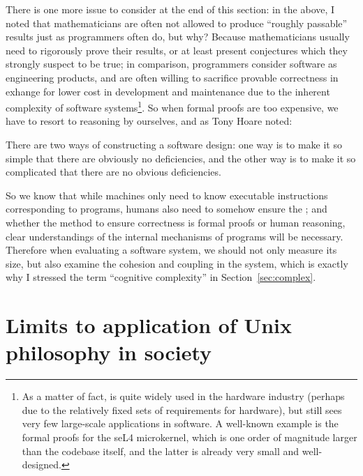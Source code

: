 There is one more issue to consider at the end of this section: in the above, I
noted that mathematicians are often not allowed to produce ``roughly passable''
results just as programmers often do, but why?  Because mathematicians usually
need to rigorously prove their results, or at least present conjectures which
they strongly suspect to be true; in comparison, programmers consider software
as engineering products, and are often willing to sacrifice provable correctness
in exhange for lower cost in development and maintenance due to the inherent
complexity of software systems\footnote{\label{fn:formal}As a matter of fact,
 is quite widely used in the hardware industry
(perhaps due to the relatively fixed sets of requirements for hardware),
but still sees very few large-scale applications in software.  A well-known
example is the formal proofs for the seL4 microkernel,
which is one order of magnitude larger than the codebase itself, and the
latter is already very small and well-designed.}.  So when formal proofs
are too expensive, we have to resort to reasoning by ourselves,
and as Tony Hoare noted:
\begin{quoting}
	There are two ways of constructing a software design: one way is to make
	it so simple that there are obviously no deficiencies, and the other way
	is to make it so complicated that there are no obvious deficiencies.
\end{quoting}
So we know that while machines only need to know executable instructions
corresponding to programs, humans also need to somehow ensure the
; and whether the method to ensure
correctness is formal proofs or human reasoning, clear understandings
of the internal mechanisms of programs will be necessary.  Therefore
when evaluating a software system, we should not only measure its size,
but also examine the cohesion and coupling in the system, which is exactly
why I stressed the term ``cognitive complexity'' in Section~\ref{sec:complex}.

\section{Limits to application of Unix philosophy in society}\label{sec:society}

